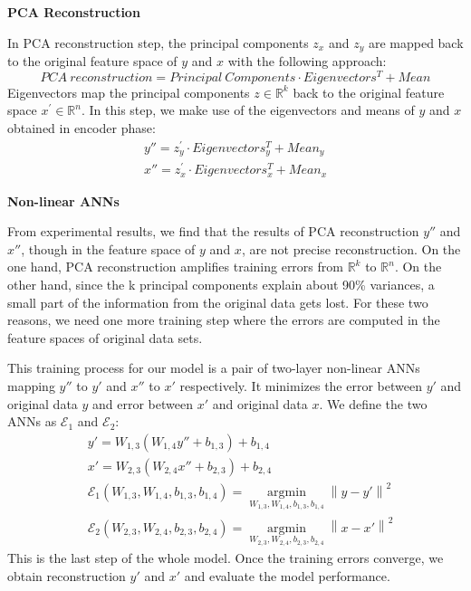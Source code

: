 \documentclass[12pt]{report} %
\newcommand{\norm}[1]{\left\lVert #1 \right\rVert}
\begin{document}
\textbf{PCA Reconstruction}

In PCA reconstruction step, the principal components $z_x$ and $z_y$ are mapped back to the original feature space of $y$ and $x$ with the following approach:
\begin{equation}
PCA\ reconstruction=Principal\ Components \cdot Eigenvectors^T + Mean
\end{equation}
Eigenvectors map the principal components $z\in \mathbb{R}^{k}$ back to the original feature space $x^{'}\in \mathbb{R}^{n}$. In this step, we make use of the eigenvectors and means of $y$ and $x$ obtained in encoder phase:
\begin{equation}
\begin{split}
y''= z_y^{'}\cdot Eigenvectors_{y}^T + Mean_y \\
x''= z_x^{'}\cdot Eigenvectors_{x}^T + Mean_x
\end{split}
\end{equation}

\textbf{Non-linear ANNs}

From experimental results, we find that the results of PCA reconstruction $y''$ and $x''$, though in the feature space of $y$ and $x$, are not precise reconstruction. On the one hand, PCA reconstruction amplifies training errors from $\mathbb{R}^{k}$ to $\mathbb{R}^{n}$. On the other hand, since the k principal components explain about 90\% variances, a small part of the information from the original data gets lost. For these two reasons, we need one more training step where the errors are computed in the feature spaces of original data sets.

This training process for our model is a pair of two-layer non-linear ANNs mapping $y''$ to $y'$ and $x''$ to $x'$ respectively. It minimizes the error between $y'$ and original data $y$ and error between $x'$ and original data $x$. We define the two ANNs as $\mathcal{E}_1$ and $\mathcal{E}_2$:
\begin{equation}
\begin{split}
&y'=W_{1,3}(W_{1,4}y''+b_{1,3})+b_{1,4} \\
&x'=W_{2,3}(W_{2,4}x''+b_{2,3})+b_{2,4} \\
&\mathcal{E}_1(W_{1,3},W_{1,4},b_{1,3},b_{1,4})=\operatorname*{argmin}_{W_{1,3},W_{1,4},b_{1,3},b_{1,4}}\norm{y-y'}^2 \\
&\mathcal{E}_2(W_{2,3},W_{2,4},b_{2,3},b_{2,4})=\operatorname*{argmin}_{W_{2,3},W_{2,4},b_{2,3},b_{2,4}}\norm{x-x'}^2
\end{split}
\end{equation}
This is the last step of the whole model. Once the training errors converge, we obtain reconstruction $y'$ and $x'$ and evaluate the model performance.
\end{document}
